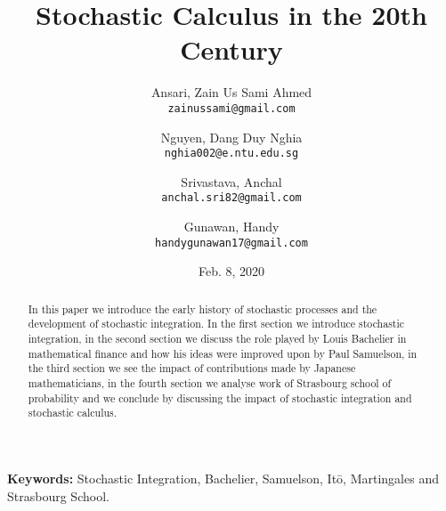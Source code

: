 \documentclass{article}
\begin{document}
\nocite{*} %

\title{Stochastic Calculus in the 20th Century}

\author{
  Ansari, Zain Us Sami Ahmed\\
  \texttt{zainussami@gmail.com}
  \and
  Nguyen, Dang Duy Nghia \\
  \texttt{nghia002@e.ntu.edu.sg}  
    \and
  Srivastava, Anchal \\
  \texttt{anchal.sri82@gmail.com}  
        \and
  Gunawan, Handy \\
  \texttt{handygunawan17@gmail.com}  
}

\date{Feb. 8, 2020} %

\maketitle

\noindent
\textbf{Keywords:} Stochastic Integration, Bachelier,  Samuelson, It\={o}, Martingales and Strasbourg School.



\begin{abstract}
In this paper we introduce the early history of stochastic processes and the development of stochastic integration.  In the first section we introduce stochastic integration, in the second section we discuss the role played by Louis Bachelier in mathematical finance and how his ideas were improved upon by Paul Samuelson, in the third section we see the impact of contributions made by Japanese mathematicians,  in the fourth section we analyse work of Strasbourg school of probability and we conclude by discussing the impact of stochastic integration and stochastic calculus.  
\end{abstract}
\end{document}
